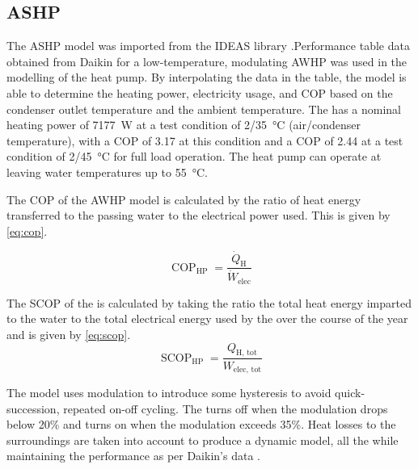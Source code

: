 \subsection{\acs{ASHP}} \label{subsec:ashp}
The \ac{ASHP} model was imported from the IDEAS library \cite{jorissen_implementation_2018}.Performance table data obtained from Daikin for a low-temperature, modulating \ac{AWHP} was used in the modelling of the heat pump. By interpolating the data in the table, the model is able to determine the heating power, electricity usage, and \ac{COP} based on the condenser outlet temperature and the ambient temperature. The \HP has a nominal heating power of \qty{7177}{\watt} at a test condition of 2/\qty{35}{\celsius} (air/condenser temperature), with a \ac{COP} of 3.17 at this condition and a \ac{COP} of 2.44 at a test condition of 2/\qty{45}{\celsius} for full load operation. The heat pump can operate at leaving water temperatures up to \qty{55}{\celsius}.

The \ac{COP} of the \ac{AWHP} model is calculated by the ratio of heat energy transferred to the passing water to the electrical power used. This is given by \cref{eq:cop}. 

\begin{equation}
    \operatorname{COP}_\text{HP}=\frac{\dot{Q}_\text{H}}{\dot{W}_\text{elec}}\label{eq:cop}
\end{equation}

The \ac{SCOP} of the \HP is calculated by taking the ratio the total heat energy imparted to the water to the total electrical energy used by the \HP over the course of the year and is given by \cref{eq:scop}.
\begin{equation}
    \operatorname{SCOP}_\text{HP}=\frac{Q_\text{H, tot}}{W_\text{elec, tot}}\label{eq:scop}
\end{equation}

The model uses modulation to introduce some hysteresis to avoid quick-succession, repeated on-off cycling. The \HP turns off when the modulation drops below 20\% and turns on when the modulation exceeds 35\%. Heat losses to the surroundings are taken into account to produce a dynamic model, all the while maintaining the performance as per Daikin's data \cite{daikin_altherma_tech_2006}.

